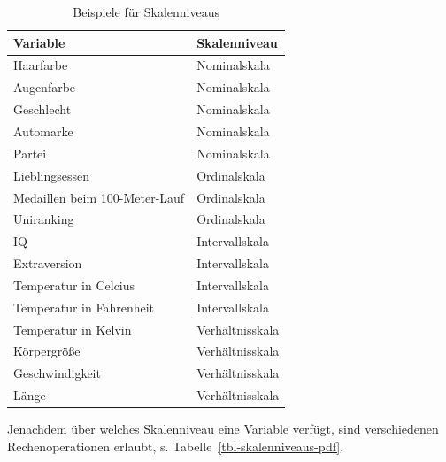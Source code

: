 \documentclass[
  letterpaper,
]{scrbook}
\theoremstyle{definition}
\theoremstyle{definition}
\theoremstyle{definition}
\theoremstyle{remark}
\begin{document}
\begin{longtable}[]{@{}ll@{}}

\caption{\label{tbl-skalen-bsps}Beispiele für Skalenniveaus}

\tabularnewline

\toprule\noalign{}
Variable & Skalenniveau \\
\midrule\noalign{}
\endhead
\bottomrule\noalign{}
\endlastfoot
Haarfarbe & Nominalskala \\
Augenfarbe & Nominalskala \\
Geschlecht & Nominalskala \\
Automarke & Nominalskala \\
Partei & Nominalskala \\
Lieblingsessen & Ordinalskala \\
Medaillen beim 100-Meter-Lauf & Ordinalskala \\
Uniranking & Ordinalskala \\
IQ & Intervallskala \\
Extraversion & Intervallskala \\
Temperatur in Celcius & Intervallskala \\
Temperatur in Fahrenheit & Intervallskala \\
Temperatur in Kelvin & Verhältnisskala \\
Körpergröße & Verhältnisskala \\
Geschwindigkeit & Verhältnisskala \\
Länge & Verhältnisskala \\

\end{longtable}

Jenachdem über welches Skalenniveau eine Variable verfügt, sind
verschiedenen Rechenoperationen erlaubt, s.
{Tabelle~\ref{tbl-skalenniveaus-pdf}}.
\end{document}
